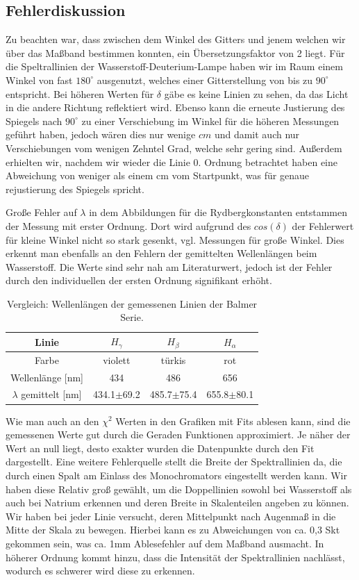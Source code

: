 \documentclass[]{article}
\begin{document}
\subsection{Fehlerdiskussion}
Zu beachten war, dass zwischen dem Winkel des Gitters und jenem welchen wir über das Maßband bestimmen konnten, ein Übersetzungsfaktor von 2 liegt. Für die Speltrallinien der Wasserstoff-Deuterium-Lampe haben wir im Raum einem Winkel von fast $180^\circ$ ausgenutzt, welches einer Gitterstellung von bis zu $90^\circ$ entspricht. Bei höheren Werten für $\delta$ gäbe es keine Linien zu sehen, da das Licht in die andere Richtung reflektiert wird. Ebenso kann die erneute Justierung des Spiegels nach $90^\circ$ zu einer Verschiebung im Winkel für die höheren Messungen geführt haben, jedoch wären dies nur wenige $cm$ und damit auch nur Verschiebungen vom wenigen Zehntel Grad, welche sehr gering sind. Außerdem erhielten wir, nachdem wir wieder die Linie 0. Ordnung betrachtet haben eine Abweichung von weniger als einem cm vom Startpunkt, was für genaue rejustierung des Spiegels spricht.

Große Fehler auf $\lambda$ in dem Abbildungen für die Rydbergkonstanten entstammen der Messung mit erster Ordnung. Dort wird aufgrund des $cos(\delta)$ der Fehlerwert für kleine Winkel nicht so stark gesenkt, vgl. Messungen für große Winkel. Dies erkennt man ebenfalls an den Fehlern der gemittelten Wellenlängen beim Wasserstoff. Die Werte sind sehr nah am Literaturwert, jedoch ist der Fehler durch den individuellen der ersten Ordnung signifikant erhöht.

\begin{table}[H]
	\centering
	\begin{tabular}{c|c|c|c}
		Linie & $H_\gamma$ & $H_\beta$ & $H_\alpha$ \\
		\hline
		Farbe & violett & türkis & rot \\
		\hline
		Wellenlänge [nm]  & 434 & 486 & 656 \\
		\hline
		\hline
		$\lambda$ gemittelt [nm] & 434.1$\pm$69.2 & 485.7$\pm$75.4 & 655.8$\pm$80.1 \\		
	\end{tabular}
	\caption{Vergleich: Wellenlängen der gemessenen Linien der Balmer Serie.}
\end{table}

Wie man auch an den $\chi^2$ Werten in den Grafiken mit Fits ablesen kann, sind die gemessenen Werte gut durch die Geraden Funktionen approximiert. Je näher der Wert an null liegt, desto exakter wurden die Datenpunkte durch den Fit dargestellt. 
Eine weitere Fehlerquelle stellt die Breite der Spektrallinien da, die durch einen Spalt am Einlass des Monochromators eingestellt werden kann. Wir haben diese Relativ groß gewählt, um die Doppellinien sowohl bei Wasserstoff als auch bei Natrium erkennen und deren Breite in Skalenteilen angeben zu können. Wir haben bei jeder Linie versucht, deren Mittelpunkt nach Augenmaß in die Mitte der Skala zu bewegen. Hierbei kann es zu Abweichungen von ca. 0,3 Skt gekommen sein, was ca. 1mm Ablesefehler auf dem Maßband ausmacht.
In höherer Ordnung kommt hinzu, dass die Intensität der Spektrallinien nachlässt, wodurch es schwerer wird diese zu erkennen.
\end{document}

